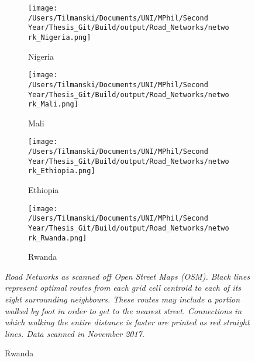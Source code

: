 \documentclass[11pt, oneside]{article}   	%
\newcommand{\mysubcaption}[1]{
\justify
\begin{spacing}{0.7}
\textit{\footnotesize #1}
\end{spacing}}
\begin{document}
\begin{figure}[t]
\centering
\caption{Road Networks for different countries as scraped off OSM}

\begin{subfigure}[c]{0.43\textwidth}
\texttt{[image: /Users/Tilmanski/Documents/UNI/MPhil/Second Year/Thesis\_Git/Build/output/Road\_Networks/network\_Nigeria.png]}
\caption{Nigeria}
\label{fig:nigeria_roads}
\end{subfigure}
\begin{subfigure}[c]{0.43\textwidth}
\texttt{[image: /Users/Tilmanski/Documents/UNI/MPhil/Second Year/Thesis\_Git/Build/output/Road\_Networks/network\_Mali.png]}
\caption{Mali}
\label{fig:Mali_roads}
\end{subfigure}

\begin{subfigure}[c]{0.43\textwidth}
\texttt{[image: /Users/Tilmanski/Documents/UNI/MPhil/Second Year/Thesis\_Git/Build/output/Road\_Networks/network\_Ethiopia.png]}
\caption{Ethiopia}
\label{fig:Ethiopia_roads}
\end{subfigure}
\begin{subfigure}[c]{0.43\textwidth}
\texttt{[image: /Users/Tilmanski/Documents/UNI/MPhil/Second Year/Thesis\_Git/Build/output/Road\_Networks/network\_Rwanda.png]}
\caption{Rwanda}
\label{fig:Rwanda_roads}
\end{subfigure}
\mysubcaption{Road Networks as scanned off Open Street Maps (OSM). Black lines represent optimal routes from each grid cell centroid to each of its eight surrounding neighbours. These routes may include a portion walked by foot in order to get to the nearest street. Connections in which walking the entire distance is faster are printed as red straight lines. Data scanned in November 2017.}

\label{fig:roads}
\end{figure}
\end{document}
